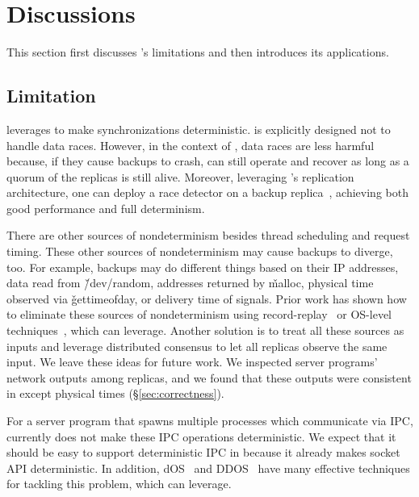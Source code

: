 \section{Discussions} \label{sec:discussion}

This section first discusses \xxx's limitations and then introduces its 
applications.

\subsection{Limitation} \label{sec:limit}


\xxx leverages \parrot to make synchronizations deterministic.  \parrot is
explicitly designed not to handle data races. However, in the context of \xxx,
data races are less harmful because, if they cause backups to crash, \xxx
can still operate and recover as long as a quorum of the replicas is
still alive. Moreover, leveraging \xxx's replication architecture, one can 
deploy a race detector on a backup replica~\cite{repframe:apsys15}, achieving 
both good \xxx performance and full determinism.

There are other sources of nondeterminism besides thread scheduling and
request timing.  These other sources of nondeterminism may cause backups
to diverge, too.  For example, backups may do different things based on
their IP addresses, data read from \v{/dev/random}, addresses returned by
\v{malloc}, physical time observed via \v{gettimeofday}, or delivery time
of signals.  Prior work has shown how to eliminate these sources of
nondeterminism using record-replay~\cite{scribe:sigmetrics2010, 
respec:asplos10} or OS-level techniques~\cite{dos:osdi10}, which \xxx can 
leverage.  Another solution is to treat all these sources as inputs and 
leverage distributed consensus to let all replicas observe the same input.  We 
leave these ideas for future work. We inspected server 
programs' network outputs among replicas, and we found that these outputs 
were consistent in \xxx except physical times (\S\ref{sec:correctness}).

For a server program that spawns multiple processes which communicate via
IPC, \xxx currently does not make these IPC operations deterministic.  We
expect that it should be easy to support deterministic IPC in \xxx because it
already makes socket API deterministic.  In addition,
dOS~\cite{dos:osdi10} and DDOS~\cite{ddos:asplos13} have many effective
techniques for tackling this problem, which \xxx can leverage.

